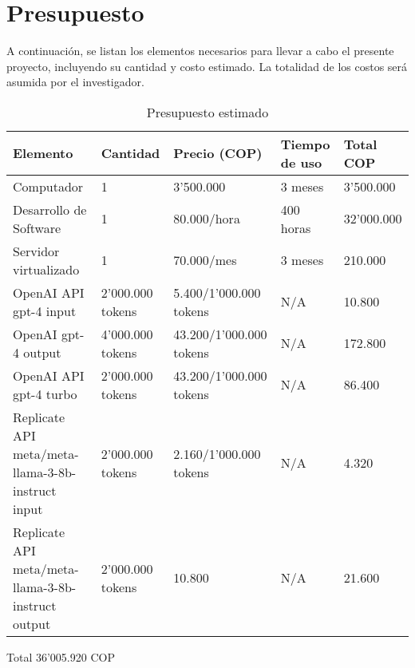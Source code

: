 
\chapter{Presupuesto}

A continuación, se listan los elementos necesarios para llevar a cabo el presente proyecto, incluyendo su cantidad y costo estimado. La totalidad de los costos será asumida por el investigador.

\begin{table}[h]
    \centering
    \begin{tabular}{p{3cm}p{2cm}p{3cm}p{3cm}p{2cm}}
      \hline
      \textbf{Elemento} & \textbf{Cantidad} & \textbf{Precio (COP)} & \textbf{Tiempo de uso} & \textbf{Total COP} \\
      \hline
      Computador & 1 & 3'500.000 & 3 meses & 3'500.000 \\
      \hline
      Desarrollo de Software & 1 & 80.000/hora & 400 horas & 32'000.000 \\
      \hline
      Servidor virtualizado & 1 & 70.000/mes & 3 meses & 210.000 \\
      \hline
      OpenAI API gpt-4 input & 2'000.000 tokens & 5.400/1'000.000 tokens & N/A & 10.800 \\
      \hline
      OpenAI gpt-4 output & 4'000.000 tokens & 43.200/1'000.000 tokens & N/A & 172.800 \\
      \hline
      OpenAI API gpt-4 turbo & 2'000.000 tokens & 43.200/1'000.000 tokens & N/A & 86.400 \\
      \hline
      Replicate API meta/meta-llama-3-8b-instruct input & 2'000.000 tokens & 2.160/1'000.000 tokens & N/A & 4.320 \\
      \hline
      Replicate API meta/meta-llama-3-8b-instruct output & 2'000.000 tokens & 10.800 & N/A & 21.600 \\
      \hline
    \end{tabular}
    \caption{Presupuesto estimado}
    \label{tab:elementos}
\end{table}

Total 36'005.920 COP
